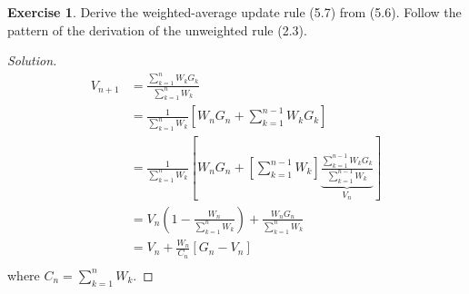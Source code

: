 \documentclass[oneside,11pt]{article}
\theoremstyle{definition}
\newtheorem{exer}[thm]{Exercise}
\newenvironment{solution}
{\renewcommand\qedsymbol{$\blacksquare$}\begin{proof}[Solution]} {\end{proof}}
\begin{document}
\begin{exer}
Derive the weighted-average update rule (5.7) from (5.6). Follow the pattern of the derivation of the unweighted rule (2.3).
\end{exer}

\begin{shaded}
\begin{solution} 

\begin{equation*} %
\begin{split}
V_{n+1} & = \frac{\sum_{k=1}^n W_k G_k}{ \sum_{k=1}^n W_k}\\
& = \frac{1}{ \sum_{k=1}^n W_k} \left [ W_n G_n + \sum_{k=1}^{n-1} W_k G_k \right ] \\
& = \frac{1}{ \sum_{k=1}^n W_k} \left [ W_n G_n + \left [  \sum_{k=1}^{n-1} W_k \right ] \underbrace{\frac{\sum_{k=1}^{n-1} W_k G_k}{ \sum_{k=1}^{n-1} W_k}}_{V_n} \right ] \\
& = V_n (1 - \frac{W_n}{\sum_{k=1}^n W_k}) + \frac{W_n G_n}{\sum_{k=1}^n W_k} \\
& = V_n + \frac{W_n}{C_n}\left [G_n - V_n \right ] \\
\end{split}
\end{equation*}
where $C_n = \sum_{k=1}^n W_k $.

\end{solution} 
\end{shaded}
\end{document}
